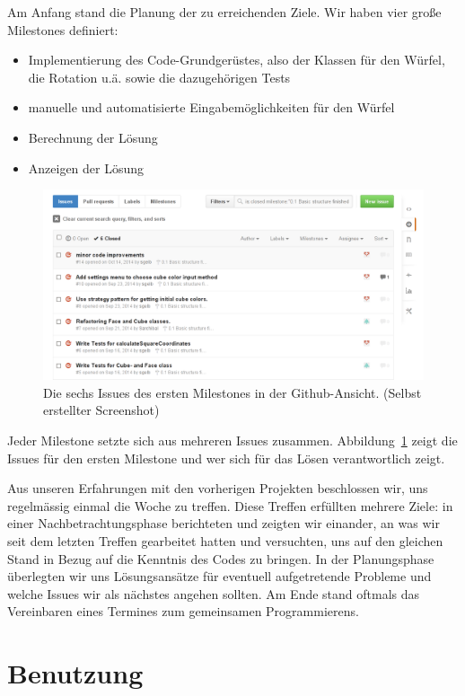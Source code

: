 Am Anfang stand die Planung der zu erreichenden Ziele. Wir haben vier große
Milestones definiert:

\begin{itemize}
  \item Implementierung des Code-Grundgerüstes, also der Klassen für den Würfel,
    die Rotation u.ä. sowie die dazugehörigen Tests
  \item manuelle und automatisierte Eingabemöglichkeiten für den Würfel
  \item Berechnung der Lösung
  \item Anzeigen der Lösung
\end{itemize}

\begin{figure}[ht!]
  \centering
  \includegraphics[width=\textwidth]{pics/github_issues.png}
  \caption{Die sechs Issues des ersten Milestones in der Github-Ansicht.
  (Selbst erstellter Screenshot)}
  \label{fig:github_issues}
\end{figure}

Jeder Milestone setzte sich aus mehreren Issues zusammen.
Abbildung~\ref{fig:github_issues} zeigt die Issues für den ersten Milestone und
wer sich für das Lösen verantwortlich zeigt.

Aus unseren Erfahrungen mit den vorherigen Projekten beschlossen wir, uns
regelmässig einmal die Woche zu treffen. Diese Treffen erfüllten mehrere Ziele:
in einer Nachbetrachtungsphase berichteten und zeigten wir einander, an was wir
seit dem letzten Treffen gearbeitet hatten und versuchten, uns auf den gleichen
Stand in Bezug auf die Kenntnis des Codes zu bringen. In der Planungsphase
überlegten wir uns Lösungsansätze für eventuell aufgetretende Probleme und
welche Issues wir als nächstes angehen sollten. Am Ende stand oftmals das
Vereinbaren eines Termines zum gemeinsamen Programmierens.


\section{Benutzung}  %

